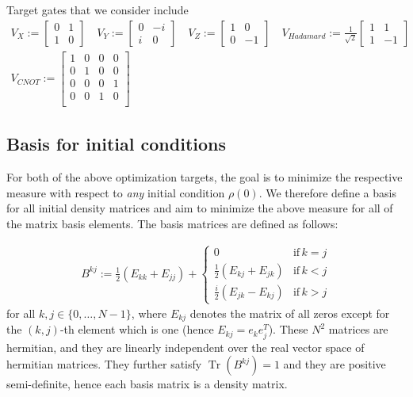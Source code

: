 \documentclass[letterpaper]{article}
\DeclareMathOperator{\Tr}{Tr}
\begin{document}
Target gates that we consider include
    \begin{align}
      V_{X} := \begin{bmatrix} 0 & 1 \\ 1 & 0  \end{bmatrix} \quad
      V_{Y} := \begin{bmatrix} 0 & -i \\ i & 0 \end{bmatrix} \quad
      V_{Z} := \begin{bmatrix} 1 & 0 \\ 0 & -1 \end{bmatrix} \quad 
      V_{Hadamard} := \frac{1}{\sqrt{2}} \begin{bmatrix} 1 & 1 \\ 1 & -1 \end{bmatrix} \\
      V_{CNOT} := \begin{bmatrix} 1  & 0 & 0 & 0 \\ 
                                   0  & 1 & 0 & 0 \\ 
                                   0  & 0 & 0 & 1 \\ 
                                   0  & 0 & 1 & 0 \\ 
                    \end{bmatrix}
    \end{align}



\subsection{Basis for initial conditions}
For both of the above optimization targets, the goal is to minimize the respective measure with respect to \textit{any} initial condition $\rho(0)$. We therefore define a basis for all initial density matrices and aim to minimize the above measure for all of the matrix basis elements. The basis matrices are defined as follows:

\begin{align}
B^{kj} := \frac 12 \left( E_{kk} + E_{jj}\right) +  \begin{cases} 
          0 & \text{if} \, k=j \\ 
        \frac 12 \left( E_{kj} + E_{jk}\right) & \text{if} \, k<j \\
        \frac i2 \left( E_{jk} - E_{kj}\right) & \text{if} \, k>j
      \end{cases} 
\end{align}
for all $k,j\in\{0,\dots, N-1\}$, where $E_{kj}$ denotes the matrix of all zeros except for the $(k,j)$-th element which is one (hence $E_{kj} = e_ke_j^T$). These $N^2$ matrices are hermitian, and they are linearly independent over the real vector space of hermitian matrices. They further satisfy $\Tr(B^{kj}) = 1$ and they are positive semi-definite, hence each basis matrix is a density matrix. 
\end{document}
